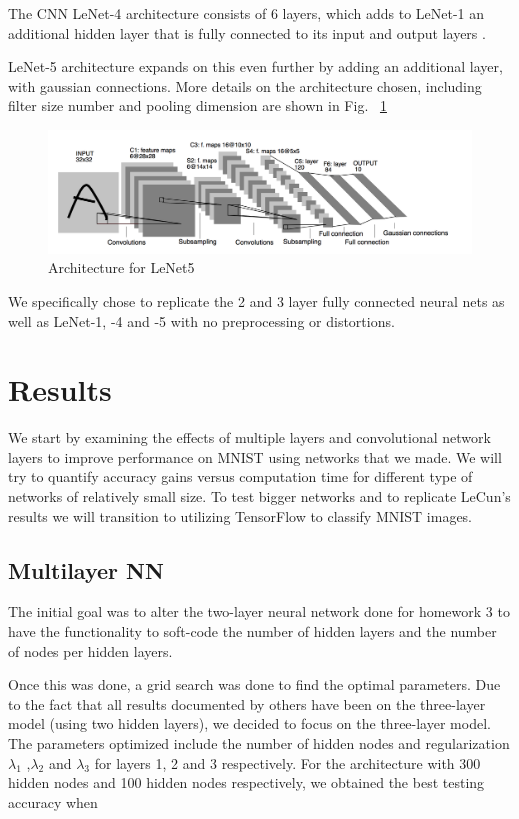 \documentclass[12pt, twocolumn]{article}
\begin{document}
The CNN LeNet-4 architecture consists of 6 layers, which adds to LeNet-1 an additional hidden layer that is fully connected to its  input and output layers . \cite{LeCun95}

LeNet-5 architecture expands on this even further by adding an additional layer, with gaussian connections. More details on the architecture chosen, including filter size number and pooling dimension are shown in Fig. ~\ref{fig:LeNet5}

 \begin{figure}
\includegraphics[scale=.6]{LeNet5.png}
\caption{Architecture for LeNet5 \cite{LeCun1998}}
\label{fig:LeNet5}
\end{figure}


 We specifically chose to replicate the 2 and 3 layer fully connected neural nets as well as LeNet-1, -4 and -5 with no preprocessing or distortions. 


\section{Results}
We start by examining the effects of multiple layers and convolutional network layers to improve performance on MNIST using networks that we made. We will try to quantify accuracy gains versus computation time for different type of networks of relatively small size. To test bigger networks and to replicate LeCun's results we will transition to utilizing TensorFlow to classify MNIST images. 

\subsection{Multilayer NN}
The initial goal was to alter the two-layer neural network done for homework 3 to have the functionality to soft-code the number of hidden layers and the number of nodes per hidden layers.
\newline

Once this was done, a grid search was done to find the optimal parameters. Due to the fact that all results documented by others have been on the three-layer model (using two hidden layers), we decided to focus on the three-layer model. The parameters optimized include the number of hidden nodes and regularization $\lambda_1$ ,$\lambda_2$ and $\lambda_3$ for layers 1, 2 and 3 respectively.
\newline
For the architecture with 300 hidden nodes and 100 hidden nodes respectively, we obtained the best testing accuracy when 
\end{document}
